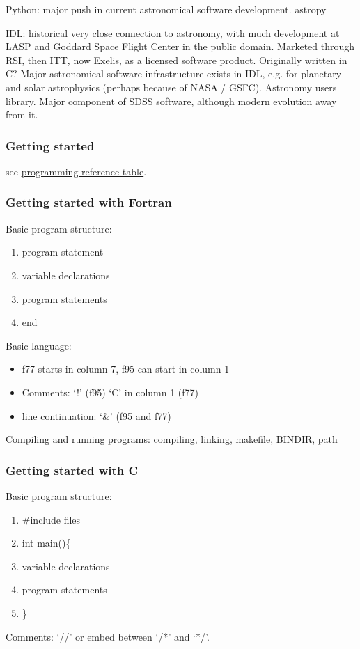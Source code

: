 \documentclass{article}
\begin{document}
Python: major push in current astronomical software development.
astropy

IDL: historical very close connection to astronomy, with much
development at LASP and Goddard Space Flight Center in the public
domain. Marketed through RSI, then ITT, now Exelis, as a licensed
software product. Originally written in C? Major astronomical software
infrastructure exists in IDL, e.g. for planetary and solar
astrophysics (perhaps because of NASA / GSFC). Astronomy users
library. Major component of SDSS software, although modern evolution
away from it.

\subsubsection{Getting started}
see \href{http://astronomy.nmsu.edu/holtz/a575/programming.html}
{programming reference table}.

\subsubsection{Getting started with Fortran}
Basic program structure:
\begin{enumerate}
    \item program statement
    \item variable declarations
    \item program statements
    \item end
\end{enumerate}
Basic language:
\begin{itemize}
    \item f77 starts in column 7, f95 can start in column 1
    \item Comments: `!' (f95) `C' in column 1 (f77)
    \item line continuation: `\&' (f95 and f77)
\end{itemize}
Compiling and running programs: compiling, linking, makefile, BINDIR,
path

\subsubsection{Getting started with C}
Basic program structure:
\begin{enumerate}
    \item \#include files
    \item int main()\{
    \item variable declarations
    \item program statements
    \item \}
\end{enumerate}
Comments: `//' or embed between `/*' and `*/'.
\end{document}
